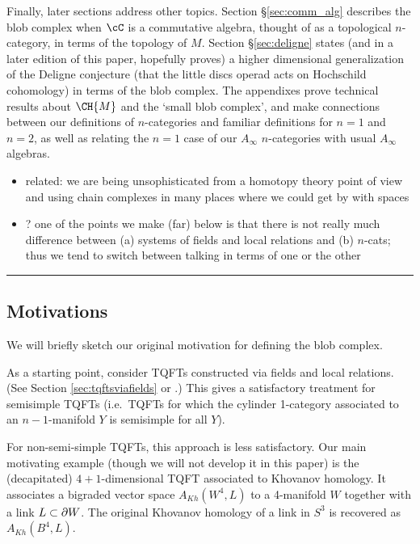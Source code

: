 Finally, later sections address other topics. Section \S \ref{sec:comm_alg} describes the blob complex when $\cC$ is a commutative algebra, thought of as a topological $n$-category, in terms of the topology of $M$. Section \S \ref{sec:deligne} states (and in a later edition of this paper, hopefully proves) a higher dimensional generalization of the Deligne conjecture (that the little discs operad acts on Hochschild cohomology) in terms of the blob complex. The appendixes prove technical results about $\CH{M}$ and the `small blob complex', and make connections between our definitions of $n$-categories and familiar definitions for $n=1$ and $n=2$, as well as relating the $n=1$ case of our $A_\infty$ $n$-categories with usual $A_\infty$ algebras.


\begin{itemize}
\item related: we are being unsophisticated from a homotopy theory point of
view and using chain complexes in many places where we could get by with spaces
\item ? one of the points we make (far) below is that there is not really much
difference between (a) systems of fields and local relations and (b) $n$-cats;
thus we tend to switch between talking in terms of one or the other
\end{itemize}

\medskip\hrule\medskip

\subsection{Motivations}
\label{sec:motivations}

We will briefly sketch our original motivation for defining the blob complex.

As a starting point, consider TQFTs constructed via fields and local relations.
(See Section \ref{sec:tqftsviafields} or \cite{kw:tqft}.)
This gives a satisfactory treatment for semisimple TQFTs
(i.e.\ TQFTs for which the cylinder 1-category associated to an
$n{-}1$-manifold $Y$ is semisimple for all $Y$).

For non-semi-simple TQFTs, this approach is less satisfactory.
Our main motivating example (though we will not develop it in this paper)
is the (decapitated) $4{+}1$-dimensional TQFT associated to Khovanov homology.
It associates a bigraded vector space $A_{Kh}(W^4, L)$ to a 4-manifold $W$ together
with a link $L \subset \partial W$.
The original Khovanov homology of a link in $S^3$ is recovered as $A_{Kh}(B^4, L)$.

